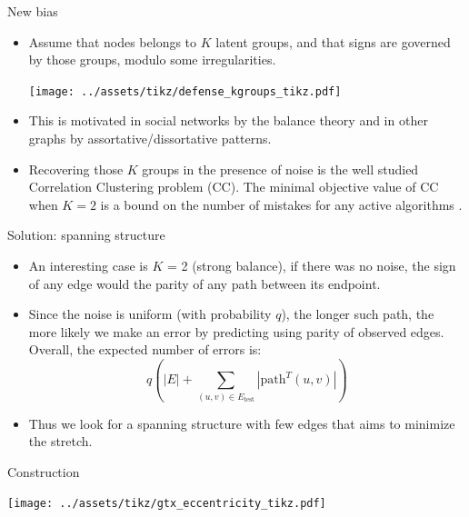 \documentclass[10pt,svgnames,ignorenonframetext,final]{beamer}
\begin{document}
\begin{frame}{New bias}

\begin{itemize}
\item
  Assume that nodes belongs to \(K\) latent groups, and that signs are
  governed by those groups, modulo some irregularities.
  \begin{center}
  \texttt{[image: ../assets/tikz/defense\_kgroups\_tikz.pdf]}
  \end{center}
\item This is motivated in social networks by the balance theory and in other graphs by assortative/dissortative patterns.
\item
  Recovering those \(K\) groups in the presence of noise is the well
  studied Correlation Clustering problem (CC). The minimal objective
  value of CC when \(K=2\) is a bound on the number of mistakes for any
  active algorithms \autocite{Cesa-Bianchi2012b}.
\end{itemize}

\end{frame}

\begin{frame}{Solution: spanning structure}

\begin{itemize}
\item
  An interesting case is \(K\) = 2 (strong balance), if there was no
  noise, the sign of any edge would the parity of any path between its
  endpoint.
\item Since the noise is uniform (with probability $q$), the longer such path, the more likely we make an error by
  predicting using parity of observed edges. Overall, the expected number of errors is:
  \begin{equation*}
    q \left(|E| + \sum_{(u,v) \in E_{\mathrm{test}}} |\mathrm{path}^T(u, v)| \right)
  \end{equation*}
\item
  Thus we look for a spanning structure with few edges that aims to minimize the stretch.
\end{itemize}
\end{frame}

\begin{frame}{Construction}
  \begin{center}
    \texttt{[image: ../assets/tikz/gtx\_eccentricity\_tikz.pdf]}
  \end{center}
\end{frame}
\end{document}
